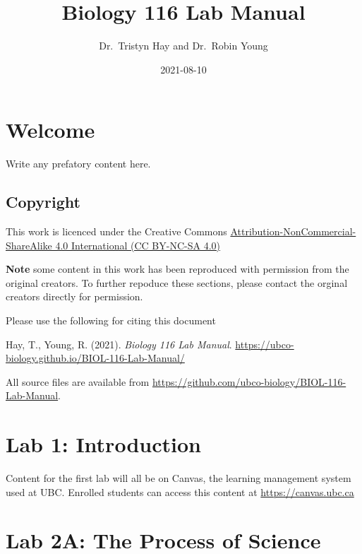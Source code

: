 \documentclass[
]{book}
\title{Biology 116 Lab Manual}
\author{Dr.~Tristyn Hay and Dr.~Robin Young}
\date{2021-08-10}
\begin{document}
\maketitle

{
\setcounter{tocdepth}{1}
\tableofcontents
}
\hypertarget{welcome}{%
\chapter*{Welcome}\label{welcome}}

Write any prefatory content here.

\hypertarget{copyright}{%
\section*{Copyright}\label{copyright}}

This work is licenced under the Creative Commons \href{https://creativecommons.org/licenses/by-nc-sa/4.0/}{Attribution-NonCommercial-ShareAlike 4.0 International (CC BY-NC-SA 4.0)}

\textbf{Note} some content in this work has been reproduced with permission from the original creators. To further repoduce these sections, please contact the orginal creators directly for permission.

Please use the following for citing this document

Hay, T., Young, R. (2021). \emph{Biology 116 Lab Manual}. \url{https://ubco-biology.github.io/BIOL-116-Lab-Manual/}

All source files are available from \url{https://github.com/ubco-biology/BIOL-116-Lab-Manual}.

\hypertarget{lab-1-introduction}{%
\chapter*{Lab 1: Introduction}\label{lab-1-introduction}}

Content for the first lab will all be on Canvas, the learning management system used at UBC. Enrolled students can access this content at \url{https://canvas.ubc.ca}

\hypertarget{lab-2a-the-process-of-science}{%
\chapter*{Lab 2A: The Process of Science}\label{lab-2a-the-process-of-science}}
\end{document}
